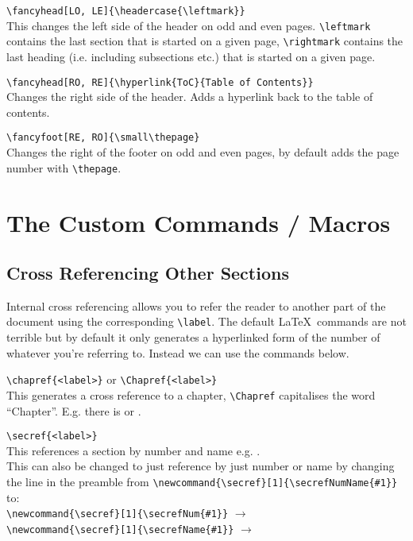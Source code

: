 \documentclass[Book Template.tex]{subfiles}
\begin{document}
                \verb+\fancyhead[LO, LE]{\headercase{\leftmark}}+\\
                This changes the left side of the header on odd and even pages. \verb+\leftmark+ contains the last section that is started on a given page, \verb+\rightmark+ contains the last heading (i.e. including subsections etc.) that is started on a given page.

                \verb+\fancyhead[RO, RE]{\hyperlink{ToC}{Table of Contents}}+\\
                Changes the right side of the header. Adds a hyperlink back to the table of contents.

                \verb+\fancyfoot[RE, RO]{\small\thepage}+\\
                Changes the right of the footer on odd and even pages, by default adds the page number with \verb+\thepage+.

        \newpage

        \section{The Custom Commands / Macros}
            \label{sec: custom commands}

            \subsection{Cross Referencing Other Sections}
                \label{subsec: cross referencing}

                Internal cross referencing allows you to refer the reader to another part of the document using the corresponding \verb+\label+. The default \LaTeX~commands are not terrible but by default it only generates a hyperlinked form of the number of whatever you're referring to. Instead we can use the commands below.

                \verb+\chapref{<label>}+ or \verb+\Chapref{<label>}+\\
                This generates a cross reference to a chapter, \verb+\Chapref+ capitalises the word ``Chapter''. E.g. there is  or .

                \verb+\secref{<label>}+\\
                This references a section by number and name e.g. .\\
                This can also be changed to just reference by just number or name by changing the line in the preamble from \verb+\newcommand{\secref}[1]{\secrefNumName{#1}}+ to:\\
                \verb+\newcommand{\secref}[1]{\secrefNum{#1}}+ $\rightarrow$ \\
                \verb+\newcommand{\secref}[1]{\secrefName{#1}}+ $\rightarrow$ 
                
\end{document}
